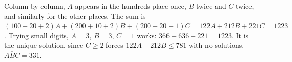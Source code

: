 Column by column, $A$ appears in the hundreds place once, $B$ twice and $C$ twice, and similarly for the other places. The sum is $(100+20+2)A+(200+10+2)B+(200+20+1)C=122A+212B+221C=1223$. Trying small digits, $A=3$, $B=3$, $C=1$ works: $366+636+221=1223$. It is the unique solution, since $C\ge2$ forces $122A+212B\le781$ with no solutions. $\overline{ABC}=\boxed{331}$.
